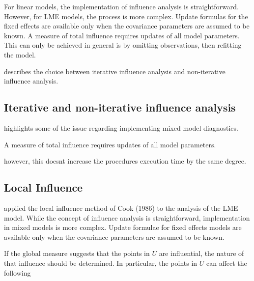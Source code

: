 \documentclass[Main.tex]{subfiles}
\begin{document}
		
				
				For linear models, the implementation of influence analysis is straightforward.
				However, for LME models, the process is more complex. Update formulas for the fixed effects are available only when the covariance parameters are assumed to be known. A measure of total influence requires updates of all model parameters.
				This can only be achieved in general is by omitting observations, then refitting the model.
				
				\citet{schabenberger} describes the choice between  iterative influence analysis and  non-iterative influence analysis.
				

	

\subsection{Iterative and non-iterative influence analysis} %
\citet{schabenberger} highlights some of the issue regarding implementing mixed model diagnostics.


A measure of total influence requires updates of all model parameters.


however, this doesnt increase the procedures execution time by the same degree.

\newpage




			
				

		
		


		
	
		\subsection{Local Influence}
		\citet{Beckman} applied the local influence method of Cook (1986) to the analysis of the LME model.
		While the concept of influence analysis is straightforward, implementation in mixed models is more complex. Update formulae for fixed effects models are available only when the covariance parameters are assumed to be known.
		
		If the global measure suggests that the points in $U$ are influential, the nature of that influence should be determined. In particular, the points in $U$ can affect the following
		
\end{document}
